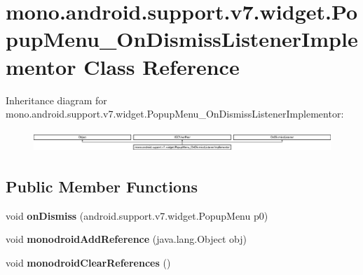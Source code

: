 \hypertarget{classmono_1_1android_1_1support_1_1v7_1_1widget_1_1_popup_menu___on_dismiss_listener_implementor}{}\section{mono.\+android.\+support.\+v7.\+widget.\+Popup\+Menu\+\_\+\+On\+Dismiss\+Listener\+Implementor Class Reference}
\label{classmono_1_1android_1_1support_1_1v7_1_1widget_1_1_popup_menu___on_dismiss_listener_implementor}
Inheritance diagram for mono.\+android.\+support.\+v7.\+widget.\+Popup\+Menu\+\_\+\+On\+Dismiss\+Listener\+Implementor\+:\begin{figure}[H]
\begin{center}
\leavevmode
\includegraphics[height=0.827790cm]{classmono_1_1android_1_1support_1_1v7_1_1widget_1_1_popup_menu___on_dismiss_listener_implementor}
\end{center}
\end{figure}
\subsection*{Public Member Functions}
\begin{DoxyCompactItemize}
\item 
\mbox{\label{classmono_1_1android_1_1support_1_1v7_1_1widget_1_1_popup_menu___on_dismiss_listener_implementor_a474799f83aa29d01bffdb0ba7f644163}} 
void {\bfseries on\+Dismiss} (android.\+support.\+v7.\+widget.\+Popup\+Menu p0)
\item 
\mbox{\label{classmono_1_1android_1_1support_1_1v7_1_1widget_1_1_popup_menu___on_dismiss_listener_implementor_afc755fd6a7af3fa62ab68a4c2c9f4d4c}} 
void {\bfseries monodroid\+Add\+Reference} (java.\+lang.\+Object obj)
\item 
\mbox{\label{classmono_1_1android_1_1support_1_1v7_1_1widget_1_1_popup_menu___on_dismiss_listener_implementor_ac7bbc2cdc32f800fc1ebb9767a75b29a}} 
void {\bfseries monodroid\+Clear\+References} ()
\end{DoxyCompactItemize}
